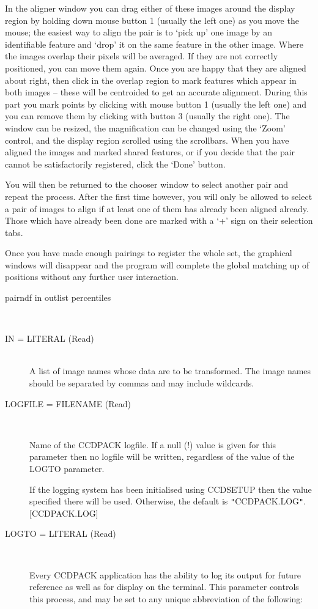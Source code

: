 \documentclass[twoside,11pt]{article}
\newcommand{\htmlref}[2]{#1}
\renewcommand{\_}{\texttt{\symbol{95}}}
\newcommand{\qt}[1]{{\tt "}#1{\tt "}}
\newcommand{\xroutine}[1]{\htmlref{{\sc #1}}{#1}}
\newcommand{\sstusage}[1]{\item[Usage:] \mbox{}
   \begin{description}
      {\ssttt \item #1}
   \end{description}
}
\newcommand{\sstparameters}[1]{
   \item[Parameters:] \mbox{} \\
   \vspace{-3.5ex}
   \begin{description}
      #1
   \end{description}
}
\newcommand{\sstsubsection}[1]{ \item[{#1}] \mbox{} \\}
\newcommand{\sstitemlist}[1]{
  \mbox{} \\
  \vspace{-3.5ex}
  \begin{itemize}
     #1
  \end{itemize}
}
\newcommand{\sstusage}[1]{\item[Usage:]
      \begin{description}
         {\ssttt #1}
      \end{description}
      \\
   }
\newcommand{\sstparameters}[1]{
      \item[Parameters:] \\
      \begin{description}
         #1
      \end{description}
      \\
   }
\newcommand{\sstsubsection}[1]{\item[{#1}]}
\newcommand{\sstitemlist}[1]{
      \begin{itemize}
         #1
      \end{itemize}
      \\
   }
\begin{document}
{{      In the aligner window you can drag either of these images around
      the display region by holding down mouse button 1 (usually the 
      left one) as you move the mouse; the easiest way to align the pair 
      is to `pick up' one image by an identifiable feature and `drop' it
      on the same feature in the other image.  Where the images overlap
      their pixels will be averaged.  If they are not correctly 
      positioned, you can move them again.  Once you are happy that
      they are aligned about right, then click in the overlap region
      to mark features which appear in both images -- these will be
      centroided to get an accurate alignment.  During this
      part you mark points by clicking with mouse button 1 (usually
      the left one) and you can remove them by clicking with button 3
      (usually the right one).  The window can be resized, the 
      magnification can be changed using the `Zoom' control, and the 
      display region scrolled using the scrollbars.  When you have aligned 
      the images and marked shared features, or if you decide that
      the pair cannot be satisfactorily registered, click the `Done' 
      button.  

      You will then be returned to the chooser window to select another
      pair and repeat the process.  After the first time however, 
      you will only be allowed to select a pair of images to align
      if at least one of them has already been aligned already.  Those
      which have already been done are marked with a `+' sign on their
      selection tabs.

      Once you have made enough pairings to register the whole set, the
      graphical windows will disappear and the program will complete
      the global matching up of positions without any further user 
      interaction.
   }
   \sstusage{
      pairndf in outlist percentiles
   }
   \sstparameters{
      \sstsubsection{
         IN = LITERAL (Read)
      } {
         A list of image names whose data are to be transformed. The image
         names should be separated by commas and may include wildcards.
      }
      \sstsubsection{
         LOGFILE = FILENAME (Read)
      } {
         Name of the CCDPACK logfile.  If a null (!) value is given for
         this parameter then no logfile will be written, regardless of
         the value of the LOGTO parameter.

         If the logging system has been initialised using \xroutine{CCDSETUP}
         then the value specified there will be used. Otherwise, the
         default is \qt{CCDPACK.LOG}.
         [CCDPACK.LOG]
      }
      \sstsubsection{
         LOGTO = LITERAL (Read)
      } {
         Every CCDPACK application has the ability to log its output
         for future reference as well as for display on the terminal.
         This parameter controls this process, and may be set to any
         unique abbreviation of the following:
         \sstitemlist{

}}}}
\end{document}
